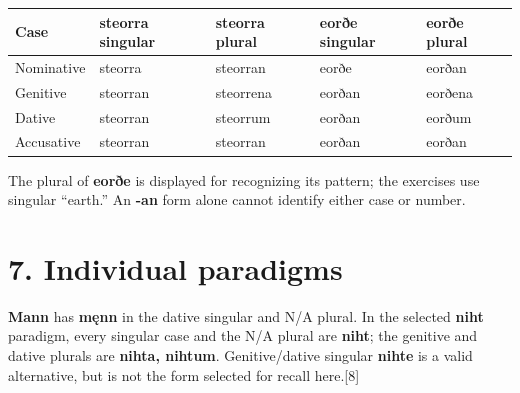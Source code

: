 \par\begingroup
\fontsize{10.5}{13.2}\selectfont
\setlength{\LTleft}{0pt}\setlength{\LTright}{\fill}
\noindent
\begin{tabular}{@{}>{\raggedright\arraybackslash}p{22.0mm}>{\raggedright\arraybackslash}p{22.688mm}>{\raggedright\arraybackslash}p{22.688mm}>{\raggedright\arraybackslash}p{22.688mm}>{\raggedright\arraybackslash}p{22.688mm}@{}}
\toprule
\textbf{Case} & \textbf{steorra singular} & \textbf{steorra plural} & \textbf{eorðe singular} & \textbf{eorðe plural} \\
\midrule
Nominative & steorra & steorran & eorðe & eorðan \\
Genitive & steorran & steorrena & eorðan & eorðena \\
Dative & steorran & steorrum & eorðan & eorðum \\
Accusative & steorran & steorran & eorðan & eorðan \\
\bottomrule
\end{tabular}
\par\endgroup

The plural of \textbf{eorðe} is displayed for recognizing its pattern; the exercises use singular “earth.” An \textbf{-an} form alone cannot identify either case or number.

\section*{7. Individual paradigms}

\textbf{Mann} has \textbf{męnn} in the dative singular and N/\allowbreak{}A plural. In the selected \textbf{niht} paradigm, every singular case and the N/\allowbreak{}A plural are \textbf{niht}; the genitive and dative plurals are \textbf{nihta, nihtum}. Genitive/\allowbreak{}dative singular \textbf{nihte} is a valid alternative, but is not the form selected for recall here.[8]

